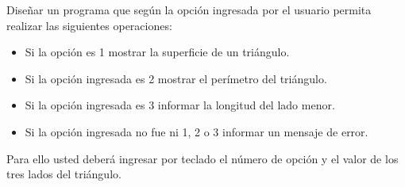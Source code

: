 Diseñar un programa que según la opción ingresada por el usuario permita realizar las siguientes operaciones:

\begin{itemize}
	\item Si la opción es 1 mostrar la superficie de un triángulo.
	\item Si la opción ingresada es 2 mostrar el perímetro del triángulo.
	\item Si la opción ingresada es 3 informar la longitud del lado menor.
	\item Si la opción ingresada no fue ni 1, 2 o 3 informar un mensaje de error.
\end{itemize}
Para ello usted deberá ingresar por teclado el número de opción y el valor de los tres lados del triángulo.